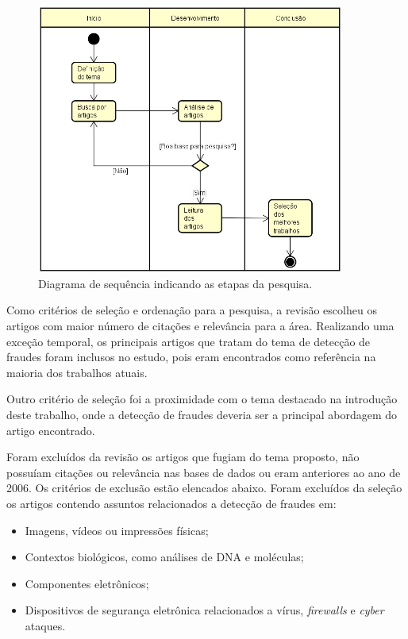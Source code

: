 \documentclass[smallextended]{svjour3}       %
\begin{document}
\begin{figure}[!ht]
	\centering
	\includegraphics[width=0.9\textwidth]{imagens/diagrama.jpg}
	\caption{Diagrama de sequência indicando as etapas da pesquisa.}
	\label{fig:diagrama}
\end{figure}

Como critérios de seleção e ordenação para a pesquisa, a revisão escolheu os artigos com maior número de citações e relevância para a área. Realizando uma exceção temporal, os principais artigos que tratam do tema de detecção de fraudes foram inclusos no estudo, pois eram encontrados como referência na maioria dos trabalhos atuais.

Outro critério de seleção foi a proximidade com o tema destacado na introdução deste trabalho, onde a detecção de fraudes deveria ser a principal abordagem do artigo encontrado.

Foram excluídos da revisão os artigos que fugiam do tema proposto, não possuíam citações ou relevância nas bases de dados ou eram anteriores ao ano de 2006. Os critérios de exclusão estão elencados abaixo. Foram excluídos da seleção os artigos contendo assuntos relacionados a detecção de fraudes em:

\begin{itemize}
	\item Imagens, vídeos ou impressões físicas;
	
	\item Contextos biológicos, como análises de DNA e moléculas;
	
	\item Componentes eletrônicos; 	
	
	\item Dispositivos de segurança eletrônica relacionados a vírus, \emph{firewalls} e \emph{cyber} ataques.
\end{itemize}
\end{document}

